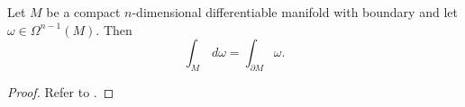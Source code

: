 \documentclass[12pt,a4paper]{article}
\begin{document}
\begin{theorem}
Let $M$ be a compact $n$-dimensional differentiable manifold with boundary and let $\omega\in\Omega^{n-1}(M)$. Then
\[
\int_M\,d\omega=\int_{\partial M}\omega.
\]
\label{thm:stokes}
\end{theorem}
\begin{proof}
Refer to \cite{andrews}.
\end{proof}
\end{document}
